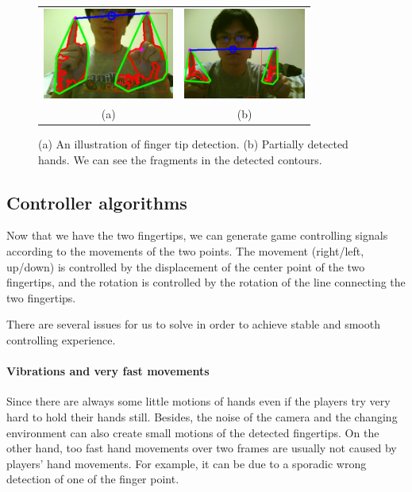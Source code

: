 \documentclass[10pt,twocolumn,letterpaper]{article}
\begin{document}
\begin{figure}[h]
\centering
\begin{tabular}{cc}
\includegraphics[height=3cm]{fingertip.png} &
\includegraphics[height=3cm]{partialhand.png} \\
(a) &
(b) 
\end{tabular}
\caption{(a) An illustration of finger tip detection. (b) 
Partially detected hands. We can see the fragments in the 
detected contours.
}
\label{fig:fingertip}
\end{figure}

\subsection{Controller algorithms}
Now that we have the two fingertips, we can generate game 
controlling signals according to the movements of the two points. 
The movement (right/left, up/down) is controlled by the 
displacement of the center point of the two fingertips, and 
the rotation is controlled by the rotation of the line connecting 
the two fingertips. 

There are several issues for us to solve in order to achieve stable and smooth controlling experience.

\paragraph{Vibrations and very fast movements} 
Since there are always some little motions of hands even if the players try very hard 
to hold their hands still. Besides, the noise of the camera and the changing environment 
can also create small motions of the detected fingertips. On the other hand, too fast 
hand movements over two frames are usually not caused by players' hand movements. 
For example, it can be due to a sporadic wrong detection of one of the finger point. 
\end{document}
